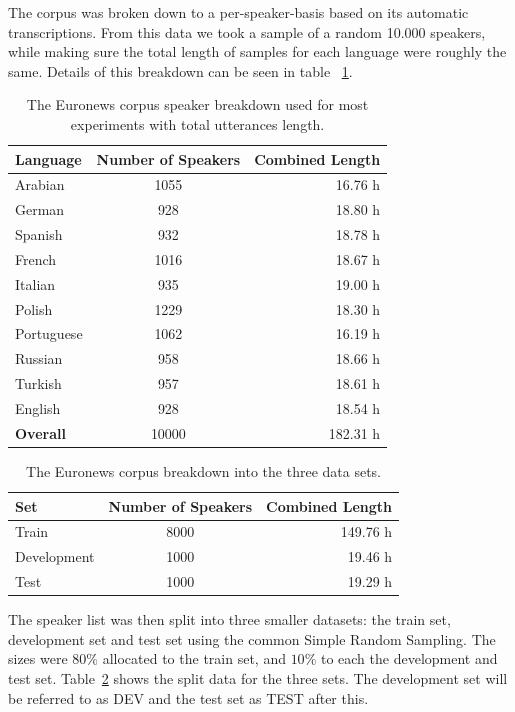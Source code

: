 The corpus was broken down to a per-speaker-basis based on its automatic transcriptions. From this data we took a sample of a random 10.000 speakers, while making sure the total length of samples for each language were roughly the same. Details of this breakdown can be seen in table ~\ref{tab:spkData}.

\begin{table}[h!]
\caption{The Euronews corpus speaker breakdown used for most experiments with total utterances length.}
\label{tab:spkData}
\centering
\begin{tabular}{| l | c | r | }
	\hline
	\textbf{Language} & \textbf{Number of Speakers} & \textbf{Combined Length} \\
	\hline
	Arabian & 1055 & 16.76 h \\
	German & 928 & 18.80 h \\
	Spanish & 932 & 18.78 h \\
	French & 1016 & 18.67 h \\  
	Italian & 935 & 19.00 h \\  
	Polish & 1229 & 18.30 h \\ 
	Portuguese & 1062 & 16.19 h \\ 
	Russian & 958 & 18.66 h \\ 
	Turkish & 957 & 18.61 h \\  
	English & 928 & 18.54 h \\ 
	\hline
	\textbf{Overall} & 10000 & 182.31 h\\
	\hline	
\end{tabular}
\end{table}

\begin{table}[h!]
\caption{The Euronews corpus breakdown into the three data sets.}
\label{tab:spkSplit}
\centering
\begin{tabular}{| l | c | r | }
	\hline
	\textbf{Set} & \textbf{Number of Speakers} & \textbf{Combined Length} \\
	\hline
	Train &  8000 & 149.76 h \\
	Development & 1000 & 19.46 h \\
	Test & 1000 & 19.29 h \\
	\hline
\end{tabular}
\end{table}

The speaker list was then split into three smaller datasets: the train set, development set and test set using the common Simple Random Sampling. The sizes were \(80\%\) allocated to the train set, and \(10\%\) to each the development and test set. Table~\ref{tab:spkSplit} shows the split data for the three sets. The development set will be referred to as DEV and the test set as TEST after this.

